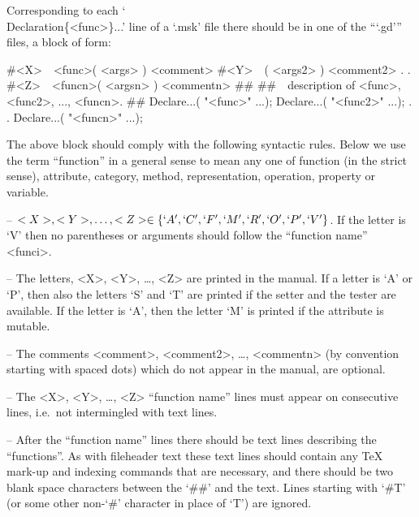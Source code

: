 Corresponding to each `\\Declaration\{<func>\}...' line of a `.msk'  file
there should be in one of the ```.gd''' files, a block of form:

\)\#<X>\ \ <func>( <args> ) <comment>
\)\#<Y>\ \ <func2>( <args2> ) <comment2>
\).
\).
\)\#<Z>\ \ <funcn>( <argsn> ) <commentn>
\)\#\#
\)\#\#\ \ description of <func>, <func2>, ..., <funcn>.
\)\#\#
Declare...( "<func>" ...);
Declare...( "<func2>" ...);
\).
\).
Declare...( "<funcn>" ...);

The above block should comply with the following syntactic  rules.  Below
we use the term ``function'' in a  general  sense  to  mean  any  one  of
function  (in   the   strict   sense),   attribute,   category,   method,
representation, operation, property or variable.

\beginlist%

\item{--}
$<X>, <Y>, \dots, <Z> \in \{ `A', `C', `F', `M', `R', `O', `P', `V'  \}$.
If the letter is `V' then no parentheses or arguments should  follow  the
``function name'' <funci>.

\item{--}
The letters, <X>, <Y>, \dots, <Z> are printed in the manual. If a  letter
is `A' or `P', then also the letters `S'  and  `T'  are  printed  if  the
setter and the tester are available. If  the  letter  is  `A',  then  the
letter `M' is printed if the attribute is mutable.

\item{--}
The comments <comment>,  <comment2>,  \dots,  <commentn>  (by  convention
starting with spaced dots)  which  do  not  appear  in  the  manual,  are
optional.

\item{--}
The  <X>,  <Y>,  \dots,  <Z>  ``function  name''  lines  must  appear  on
consecutive lines, i.e.~not intermingled with text lines.

\item{--}
After the ``function name'' lines there should be text  lines  describing
the ``functions''. As  with  fileheader  text  these  text  lines  should
contain any {\TeX} mark-up and indexing commands that are necessary,  and
there should be two blank space characters between  the  `\#\#'  and  the
text. Lines starting with `\#T' (or  some  other  non-`\#'  character  in
place of `T') are ignored.

